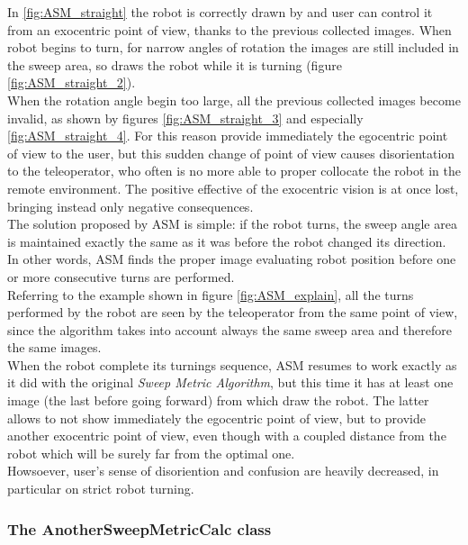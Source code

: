 In \ref{fig:ASM_straight} the robot is correctly drawn by \framework{}
and user can control it from an exocentric point of view, thanks to
the previous collected images. When robot begins to turn, for narrow
angles of rotation the images are still included in the sweep area, so
\framework{} draws the robot while it is turning (figure
\ref{fig:ASM_straight_2}).
\\
When the rotation angle begin too large, all the previous collected images
become invalid, as shown by figures \ref{fig:ASM_straight_3} and
especially \ref{fig:ASM_straight_4}. For this reason \framework{} provide
immediately the egocentric point of view to the user, but this sudden change
of point of view causes disorientation to the teleoperator, who often is
no more able to proper collocate the robot in the remote environment. The
positive effective of the exocentric vision is at once lost, bringing
instead only negative consequences.
\\
The solution proposed by ASM is simple: if the robot turns, the sweep angle
area is maintained exactly the same as it was before the robot changed
its direction. In other words, ASM finds the proper image evaluating robot
position before one or more consecutive turns are performed.
\\
Referring to the example shown in figure \ref{fig:ASM_explain}, all the
turns performed by the robot are seen by the teleoperator from the same
point of view, since the algorithm takes into account always the same
sweep area and therefore the same images.
\\
When the robot complete its turnings sequence, ASM resumes to
work exactly as it did with the original \textit{Sweep Metric Algorithm},
but this time it has at least one image (the last before going forward)
from which draw the robot. The latter allows \framework{} to not show
immediately the egocentric point of view, but to provide another exocentric
point of view, even though with a coupled distance from the robot which
will be surely far from the optimal one.
\\
Howsoever, user's sense of disoriention and confusion are heavily decreased,
in particular on strict robot turning.

\subsubsection{The AnotherSweepMetricCalc class}
\label{concr:iimageselector:another_sweep_metric_class}

